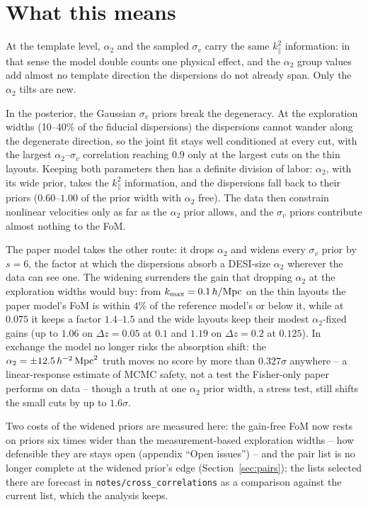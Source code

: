 \documentclass[11pt]{article}
\newcommand{\kmax}{k_{\rm max}}
\newcommand{\hMpc}{\,h/{\rm Mpc}}
\newcommand{\aunit}{\,h^{-2}\,{\rm Mpc}^2}
\newcommand{\sv}{\sigma_v}
\newcommand{\us}{\_\allowbreak}
\begin{document}
\section{What this means}
\label{sec:meaning}

At the template level, $\alpha_2$ and the sampled $\sv$ carry the same
$k_\parallel^2$ information: in that sense the model double counts one
physical effect, and the $\alpha_2$ group values add almost no
template direction the dispersions do not already span.  Only the
$\alpha_2$ tilts are new.

In the posterior, the Gaussian $\sv$ priors break the degeneracy.
At the exploration widths (10--40\% of the fiducial dispersions) the
dispersions cannot wander along the degenerate direction, so the
joint fit stays well conditioned at every cut, with the largest
$\alpha_2$--$\sv$ correlation reaching $0.9$ only at the largest cuts
on the thin layouts.  Keeping both parameters then has a definite
division of labor: $\alpha_2$, with its wide prior, takes the
$k_\parallel^2$ information, and the dispersions fall back to their
priors ($0.60$--$1.00$ of the prior width with $\alpha_2$ free).  The
data then constrain nonlinear velocities only as far as the
$\alpha_2$ prior allows, and the $\sv$ priors contribute almost
nothing to the FoM.

The paper model takes the other route: it drops $\alpha_2$ and widens
every $\sv$ prior by $s = 6$, the factor at which the dispersions
absorb a DESI-size $\alpha_2$ wherever the data can see one.  The
widening surrenders the gain that dropping $\alpha_2$ at the
exploration widths would buy: from $\kmax = 0.1\hMpc$ on the thin
layouts the paper model's FoM is within $4\%$ of the reference
model's or below it, while at $0.075$ it keeps a factor $1.4$--$1.5$
and the wide layouts keep their modest $\alpha_2$-fixed gains (up to
$1.06$ on $\Delta z = 0.05$ at $0.1$ and $1.19$ on $\Delta z = 0.2$
at $0.125$).  In exchange the model no longer risks the absorption
shift: the $\alpha_2 = \pm 12.5\aunit$ truth moves no score by more
than $0.327\sigma$ anywhere -- a linear-response estimate of MCMC
safety, not a test the Fisher-only paper performs on data -- though a
truth at one $\alpha_2$ prior width, a stress test, still shifts the
small cuts by up to $1.6\sigma$.

Two costs of the widened priors are measured here: the gain-free FoM
now rests on priors six times wider than the measurement-based
exploration widths -- how defensible they are stays open (appendix
``Open issues'') -- and the pair list is no longer complete at the
widened prior's edge (Section~\ref{sec:pairs}); the lists selected
there are forecast in \texttt{notes/cross\us correlations} as a
comparison against the current list, which the analysis keeps.
\end{document}
